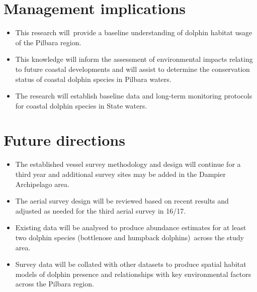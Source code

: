 \documentclass[version=last,
    paper=a4, %
    10pt, %
    usenames,
    dvipsnames,
    oneside, %
    headings=openany, %
    DIV=15 %
]{scrbook}
\begin{document}
\section*{Management implications}
\begin{itemize}
\itemsep1pt\parskip0pt
\item
  This research will~provide a baseline understanding of dolphin habitat
  usage of the Pilbara region.
\item
  This knowledge will inform the assessment of environmental impacts
  relating to future coastal developments and will assist to determine
  the conservation status of coastal dolphin species in Pilbara waters.
\item
  The research will establish baseline data and long-term monitoring
  protocols for coastal dolphin species in State waters.~
\end{itemize}



\section*{Future directions}
\begin{itemize}
\itemsep1pt\parskip0pt
\item
  The established vessel survey methodology and design will continue for
  a third year and additional survey sites may be added in the Dampier
  Archipelago area.
\item
  The aerial survey design will be reviewed based on recent results and
  adjusted as needed for the third aerial survey in 16/17.
\item
  Existing data will be analysed to produce abundance estimates for at
  least two dolphin species (bottlenose and humpback dolphins)~across
  the study area.
\item
  Survey data will be collated with other datasets to produce spatial
  habitat models of dolphin presence and relationships with key
  environmental factors across the Pilbara region.~
\end{itemize}



\end{document}
